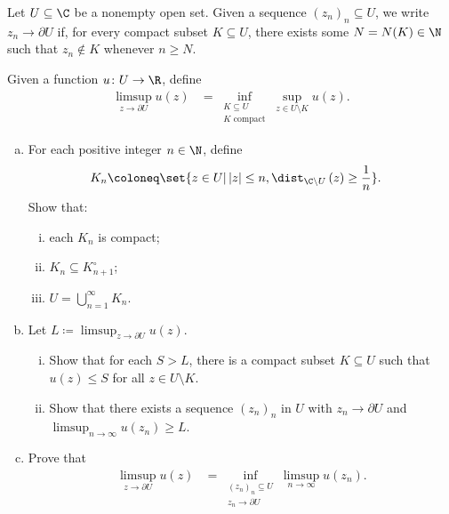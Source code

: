 \documentclass[10pt]{mypackage}
\begin{document}
\RaggedRight
\begin{problem}[Problem 1]
  Let $U\subseteq \C$ be a nonempty open set. Given a sequence $\left( z_n \right)_n\subseteq U$, we write $z_n\rightarrow \partial U$ if, for every compact subset $K\subseteq U$, there exists some $N = N(K)\in \N$ such that $z_n\notin K$ whenever $n\geq N$.\newline

  Given a function $u\colon U\rightarrow \R$, define
  \begin{align*}
    \limsup_{z\rightarrow \partial U} u(z) &= \inf_{\substack{K\subseteq U\\K\text{ compact}}} \sup_{z\in U\setminus K} u(z).
  \end{align*}
  \begin{enumerate}[(a)]
    \item For each positive integer $n\in\N$, define
      \begin{align*}
        K_n &\coloneq \set{z\in U | \left\vert z \right\vert \leq n, \dist_{\C\setminus U}\left( z \right) \geq \frac{1}{n}}.
      \end{align*}
      Show that:
      \begin{enumerate}[(i)]
        \item each $K_n$ is compact;
        \item $K_n\subseteq K_{n+1}^{\circ}$;
        \item $U = \bigcup_{n=1}^{\infty}K_n$.
      \end{enumerate}
    \item Let $L \coloneq \limsup_{z\rightarrow \partial U} u(z)$.
      \begin{enumerate}[(i)]
        \item Show that for each $S > L$, there is a compact subset $K\subseteq U$ such that $u(z)\leq S$ for all $z\in U\setminus K$.
        \item Show that there exists a sequence $\left( z_n \right)_n$ in $U$ with $z_n\rightarrow \partial U$ and $\limsup_{n\rightarrow\infty}u\left( z_n \right)\geq L$.
      \end{enumerate}
    \item Prove that
      \begin{align*}
        \limsup_{z\rightarrow \partial U} u(z) &= \inf_{\substack{\left( z_n \right)_n\subseteq U\\z_n\rightarrow \partial U}}\limsup_{n\rightarrow\infty} u\left( z_n \right).
      \end{align*}
  \end{enumerate}
\end{problem}
\end{document}
